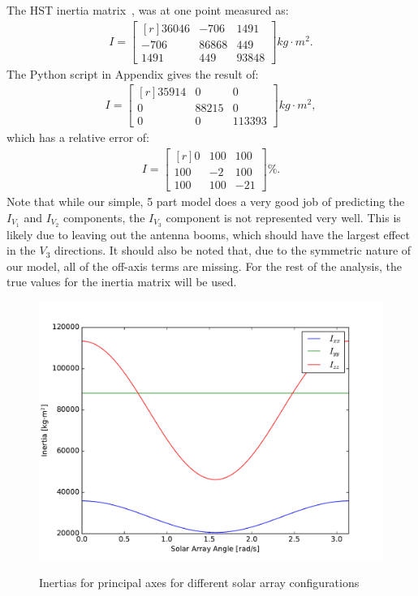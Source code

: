 \documentclass[onecolumn,10pt]{jhwhw}
\begin{document}
The HST inertia matrix~\cite{HRV}, was at one point measured as:
\begin{align*}
I =
\begin{bmatrix*}[r]
    36046       & -706  &  1491 \\
    -706        & 86868 &   449 \\
    1491        & 449   & 93848
\end{bmatrix*}
kg \cdot m^2.
\end{align*}
The Python script in Appendix gives the result of:
\begin{align*}
I =
\begin{bmatrix*}[r]
   35914 &      0 &      0 \\
       0 & 88215 &      0 \\
       0 &      0 & 113393
\end{bmatrix*}
kg \cdot m^2,
\end{align*}
which has a relative error of:
\begin{align*}
I =
\begin{bmatrix*}[r]
  0 & 100 & 100 \\
100 &  -2 & 100 \\
100 & 100 & -21
\end{bmatrix*}
\%.
\end{align*}
Note that while our simple, 5 part model does a very good job of predicting the $I_{V_1}$ and $I_{V_2}$ components, the $I_{V_3}$ component is not represented very well. This is likely due to leaving out the antenna booms, which should have the largest effect in the $V_3$ directions. It should also be noted that, due to the symmetric nature of our model, all of the off-axis terms are missing. For the rest of the analysis, the true values for the inertia matrix will be used.

\begin{figure}[h!]
\begin{center}
\includegraphics[height=0.45\textheight]{figure1.pdf}
\label{fig:on}
\end{center}
\caption{Inertias for principal axes for different solar array configurations}
\end{figure}
\end{document}

